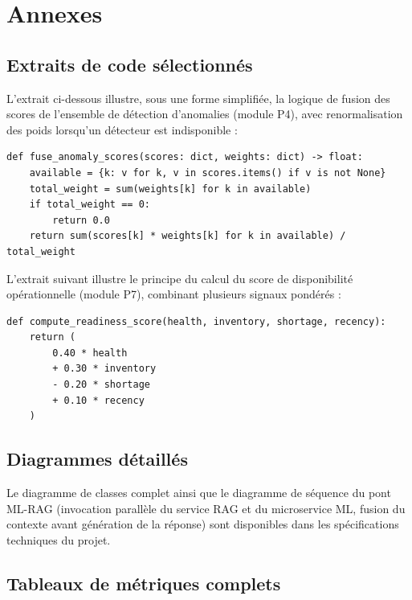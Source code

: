 \appendix
\chapter{Annexes}

\section{Extraits de code sélectionnés}

L'extrait ci-dessous illustre, sous une forme simplifiée, la logique de fusion des scores de l'ensemble de détection d'anomalies (module P4), avec renormalisation des poids lorsqu'un détecteur est indisponible :

\begin{verbatim}
def fuse_anomaly_scores(scores: dict, weights: dict) -> float:
    available = {k: v for k, v in scores.items() if v is not None}
    total_weight = sum(weights[k] for k in available)
    if total_weight == 0:
        return 0.0
    return sum(scores[k] * weights[k] for k in available) / total_weight
\end{verbatim}

L'extrait suivant illustre le principe du calcul du score de disponibilité opérationnelle (module P7), combinant plusieurs signaux pondérés :

\begin{verbatim}
def compute_readiness_score(health, inventory, shortage, recency):
    return (
        0.40 * health
        + 0.30 * inventory
        - 0.20 * shortage
        + 0.10 * recency
    )
\end{verbatim}

\section{Diagrammes détaillés}

Le diagramme de classes complet ainsi que le diagramme de séquence du pont ML-RAG (invocation parallèle du service RAG et du microservice ML, fusion du contexte avant génération de la réponse) sont disponibles dans les spécifications techniques du projet.

\section{Tableaux de métriques complets}

